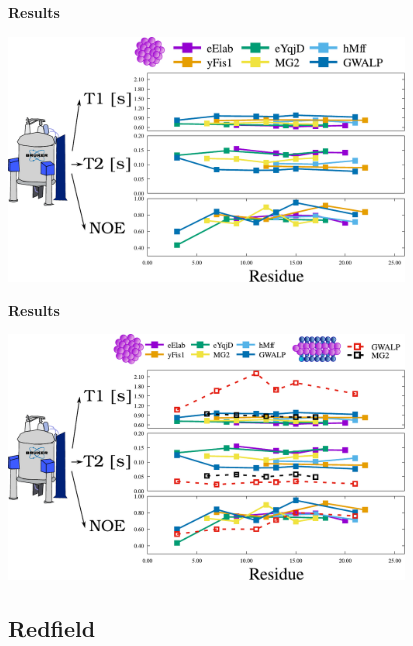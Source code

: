 \documentclass{beamer}
\begin{document}
\addtocounter{framenumber}{-1}
\begin{frame}
\begin{center}

\Large{\centering
\textbf{Results} \\}

\vspace{0.5cm}

\includegraphics[height=6.5cm]{relax_exp2.pdf}
\end{center}
\end{frame}

\addtocounter{framenumber}{-1}
\begin{frame}
\begin{center}
\Large{\centering
\textbf{Results} \\}

\vspace{0.5cm}

\includegraphics[height=6.5cm]{relax_exp3.pdf}
\end{center}
\end{frame}

\subsection{Redfield}
\end{document}
